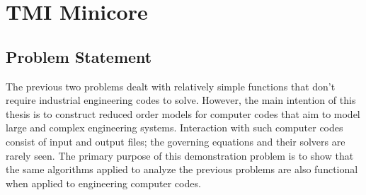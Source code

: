 \section{\ac{TMI} Minicore}
\label{sec:tmi_minicore}

\subsection{Problem Statement}
\label{subsec:tmi_minicore_ps}

The previous two problems dealt with relatively simple functions that don't require industrial engineering codes to solve. However, the main intention of this thesis is to construct reduced order models for computer codes that aim to model large and complex engineering systems. Interaction with such computer codes consist of input and output files; the governing equations and their solvers are rarely seen. The primary purpose of this demonstration problem is to show that the same algorithms applied to analyze the previous problems are also functional when applied to engineering computer codes.


